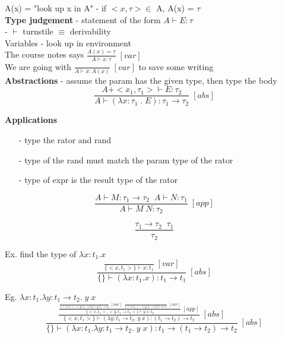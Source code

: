 \documentclass[11pt]{article}
\begin{document}
A(x) = "look up x in A" - if $<x,\tau > \in$ A, A(x) = $\tau$ \\

{\bf Type judgement} - statement of the form $A \vdash E:\tau$ \\

- $\vdash$ turnstile $\equiv$ derivability \\

Variables - look up in environment \\

The course notes says $\frac{A(x) = \tau}{A \vdash x:\tau}\;[var]$ \\

We are going with $\frac{}{A \vdash x:A(x)}\;[var]$ to save some writing \\

{\bf Abstractions} - assume the param has the given type, then type the body\\

$$\frac{A + <x_1,\tau_1> \vdash E:\tau_2}{A \vdash (\lambda x:\tau_1\;.\;E):\tau_1 \rightarrow \tau_2}\;[abs]$$

{\bf Applications}
\begin{itemize}
	\item[-] type the rator and rand
	\item[-] type of the rand must match the param type of the rator
	\item[-] type of expr is the result type of the rator
\end{itemize}

$$\frac{A \vdash M:\tau_1 \rightarrow \tau_2 \;\; A \vdash N:\tau_1}{A \vdash M\;N:\tau_2}\;[app]$$

$$\frac{\tau_1 \rightarrow \tau_2 \;\; \tau_1}{\tau_2}$$

Ex. find the type of $\lambda x:t_1.x$ \\

$$\frac{\frac{}{\{<x,t_1>\} \vdash x:t_1}\;[var]}{\{\} \vdash (\lambda x:t_1.x):t_1 \rightarrow t_1}\;[abs]$$

Eg. $\lambda x:t_1. \lambda y:t_1 \rightarrow t_2.\;y\;x$ \\

$$\frac{\frac{\frac{\frac{}{\{<x,t_1>,<y, t_1 \rightarrow t_2\} \vdash y: t_1 \rightarrow t_2}\;[var]\;\;\frac{}{\{<x,t_1>,<y,t_1 \rightarrow t_2\} \vdash x:t_1}\;[var]}{\{<x,t_1>,<y,t_1 \rightarrow t_2>\} \vdash y\;x: t_2}\;[app]}{\{<x,t_1>\} \vdash (\lambda y:t_1 \rightarrow t_2.\;y\;x): (t_1 \rightarrow t_2) \rightarrow t_2}\; [abs]}{\{\} \vdash (\lambda x:t_1. \lambda y:t_1 \rightarrow t_2.\;y\;x): t_1 \rightarrow (t_1 \rightarrow t_2) \rightarrow t_2} \; [abs]$$
\end{document}
